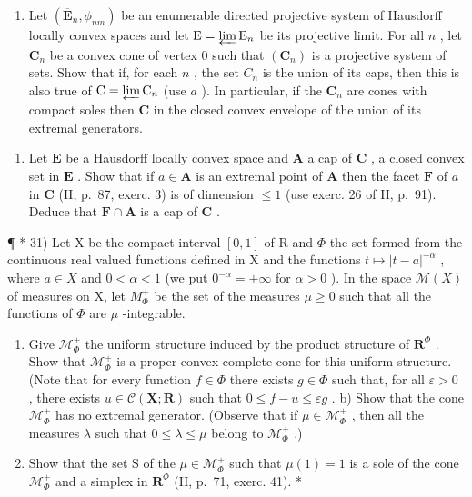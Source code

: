 \begin{enumerate}
\def\labelenumi{\alph{enumi})}
\setcounter{enumi}{1}
\tightlist
\item
  Let \((\overline{\mathbf{E}}_n, \phi_{nm})\) be an enumerable directed projective system of Hausdorff locally convex spaces and let \(\mathrm{E} = \varprojlim \mathrm{E}_n\) be its projective limit. For all \(n\) , let \(\mathbf{C}_n\) be a convex cone of vertex 0 such that \((\mathbf{C}_n)\) is a projective system of sets. Show that if, for each \(n\) , the set \(C_n\) is the union of its caps, then this is also true of \(\mathrm{C} = \varprojlim \mathrm{C}_n\) (use \(a\) ). In particular, if the \(\mathbf{C}_n\) are cones with compact soles then \(\mathbf{C}\) in the closed convex envelope of the union of its extremal generators.
\end{enumerate}

\begin{enumerate}
\def\labelenumi{\arabic{enumi})}
\setcounter{enumi}{29}
\tightlist
\item
  Let \(\mathbf{E}\) be a Hausdorff locally convex space and \(\mathbf{A}\) a cap of \(\mathbf{C}\) , a closed convex set in \(\mathbf{E}\) . Show that if \(a \in \mathbf{A}\) is an extremal point of \(\mathbf{A}\) then the facet \(\mathbf{F}\) of \(a\) in \(\mathbf{C}\) (II, p.~87, exerc. 3) is of dimension \(\leqslant 1\) (use exerc. 26 of II, p.~91). Deduce that \(\mathbf{F} \cap \mathbf{A}\) is a cap of \(\mathbf{C}\) .
\end{enumerate}

¶ * 31) Let X be the compact interval \([0, 1]\) of R and \(\Phi\) the set formed from the continuous real valued functions defined in X and the functions \(t \mapsto |t - a|^{-\alpha}\) , where \(a \in X\) and \(0 < \alpha < 1\) (we put \(0^{-\alpha} = +\infty\) for \(\alpha > 0\) ). In the space \(\mathcal{M}(X)\) of measures on X, let \(M_{\Phi}^{+}\) be the set of the measures \(\mu \geqslant 0\) such that all the functions of \(\Phi\) are \(\mu\) -integrable.

\begin{enumerate}
\def\labelenumi{\alph{enumi})}
\item
  Give \(\mathcal{M}_{\Phi}^{+}\) the uniform structure induced by the product structure of \(\mathbf{R}^{\Phi}\) . Show that \(\mathcal{M}_{\Phi}^{+}\) is a proper convex complete cone for this uniform structure. (Note that for every function \(f \in \Phi\) there exists \(g \in \Phi\) such that, for all \(\varepsilon > 0\) , there exists \(u \in \mathcal{C}(\mathbf{X}; \mathbf{R})\) such that \(0 \leqslant f - u \leqslant \varepsilon g\) . b) Show that the cone \(\mathcal{M}_{\Phi}^{+}\) has no extremal generator. (Observe that if \(\mu \in \mathcal{M}_{\Phi}^{+}\) , then all the measures \(\lambda\) such that \(0 \leqslant \lambda \leqslant \mu\) belong to \(\mathcal{M}_{\Phi}^{+}\) .)
\item
  Show that the set S of the \(\mu \in \mathcal{M}_{\Phi}^{+}\) such that \(\mu(1) = 1\) is a sole of the cone \(\mathcal{M}_{\Phi}^{+}\) and a simplex in \(\mathbf{R}^{\Phi}\) (II, p.~71, exerc. 41). *
\end{enumerate}

